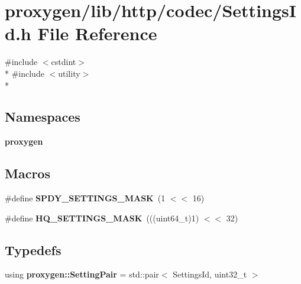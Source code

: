 \section{proxygen/lib/http/codec/\+Settings\+Id.h File Reference}
\label{SettingsId_8h}
{\ttfamily \#include $<$cstdint$>$}\\*
{\ttfamily \#include $<$utility$>$}\\*
\subsection*{Namespaces}
\begin{DoxyCompactItemize}
\item 
 {\bf proxygen}
\end{DoxyCompactItemize}
\subsection*{Macros}
\begin{DoxyCompactItemize}
\item 
\#define {\bf S\+P\+D\+Y\+\_\+\+S\+E\+T\+T\+I\+N\+G\+S\+\_\+\+M\+A\+SK}~(1 $<$$<$ 16)
\item 
\#define {\bf H\+Q\+\_\+\+S\+E\+T\+T\+I\+N\+G\+S\+\_\+\+M\+A\+SK}~(((uint64\+\_\+t)1) $<$$<$ 32)
\end{DoxyCompactItemize}
\subsection*{Typedefs}
\begin{DoxyCompactItemize}
\item 
using {\bf proxygen\+::\+Setting\+Pair} = std\+::pair$<$ Settings\+Id, uint32\+\_\+t $>$
\end{DoxyCompactItemize}
